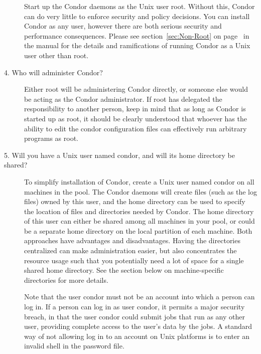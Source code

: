 \begin{description}
Start up the Condor daemons as the Unix user root.
Without this,
Condor can do very little to enforce security and policy
decisions.
You can install Condor as any user,
however there are both serious security and performance consequences.
Please see section~\ref{sec:Non-Root} on page~\pageref{sec:Non-Root}
in the manual for the details and ramifications of
running Condor as a Unix user other than root.

\item[4. Who will administer Condor?]



Either root will be administering Condor directly, or someone else
would be acting as the Condor administrator.  If root has delegated
the responsibility to another person, keep in mind that as long as
Condor is started up as root, it should be clearly understood that
whoever has the ability to edit the condor configuration files can
effectively run arbitrary programs as root.


\item[5. Will you have a Unix user named condor, and will its home
directory be shared?]

To simplify installation of Condor,
create a Unix user named condor on all machines in the pool.
The Condor daemons will create files
(such as the log files) owned by this user,
and the home directory can be used to specify the location of files
and directories needed by Condor.  The home directory of this user can
either be shared among all machines in your pool, or could be a
separate home directory on the local partition of each machine.  Both
approaches have advantages and disadvantages.  Having the directories
centralized can make administration easier, but also concentrates the
resource usage such that you potentially need a lot of space for a
single shared home directory.  See the section below on
machine-specific directories for more details.

Note that the user condor must not be an account into which a person
can log in.
If a person can log in as user condor, 
it permits a major security breach,
in that the user condor could submit jobs that run as any other user,
providing complete access to the user's data by the jobs. 
A standard way of not allowing log in to an account on Unix platforms
is to enter an invalid shell in the password file.


\end{description}
